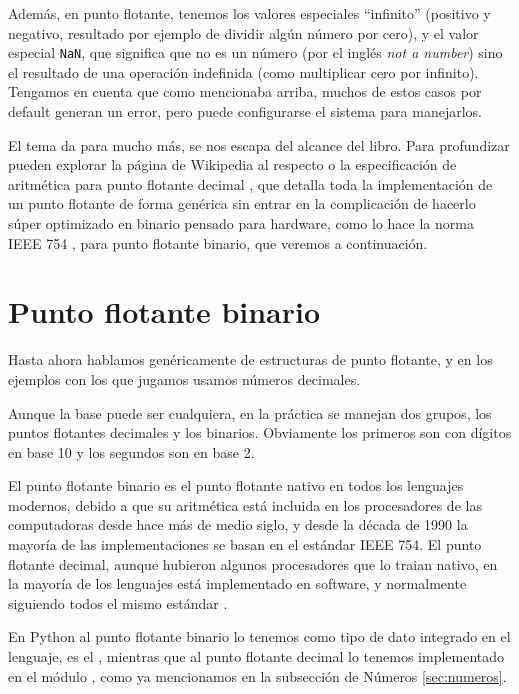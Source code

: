 Además, en punto flotante, tenemos los valores especiales ``infinito'' (positivo y negativo, resultado por ejemplo de dividir algún número por cero), y el valor especial \verb|NaN|, que significa que no es un número (por el inglés \textit{not a number}) sino el resultado de una operación indefinida (como multiplicar cero por infinito). Tengamos en cuenta que como mencionaba arriba, muchos de estos casos por default generan un error, pero puede configurarse el sistema para manejarlos.

El tema da para mucho más, se nos escapa del alcance del libro. Para profundizar pueden explorar la página de Wikipedia al respecto \cite{wikipedia-floating-point} o la especificación de aritmética para punto flotante decimal \cite{aritmetica-punto-flotante-decimal}, que detalla toda la implementación de un punto flotante de forma genérica sin entrar en la complicación de hacerlo súper optimizado en binario pensado para hardware, como lo hace la norma IEEE 754 \cite{ieee-754}, para punto flotante binario, que veremos a continuación.


\section{Punto flotante binario}\label{sec:pfbin}

Hasta ahora hablamos genéricamente de estructuras de punto flotante, y en los ejemplos con los que jugamos usamos números decimales. 

Aunque la base puede ser cualquiera, en la práctica se manejan dos grupos, los puntos flotantes decimales y los binarios. Obviamente los primeros son con dígitos en base 10 y los segundos son en base 2.

El punto flotante binario es el punto flotante nativo en todos los lenguajes modernos, debido a que su aritmética está incluida en los procesadores de las computadoras desde hace más de medio siglo, y desde la década de 1990 la mayoría de las implementaciones se basan en el estándar IEEE 754. El punto flotante decimal, aunque hubieron algunos procesadores que lo traian nativo, en la mayoría de los lenguajes está implementado en software, y normalmente siguiendo todos el mismo estándar \cite{decimal-spec}. 

En Python al punto flotante binario lo tenemos como tipo de dato integrado en el lenguaje, es el , mientras que al punto flotante decimal lo tenemos implementado en el módulo , como ya mencionamos en la subsección de Números \ref{sec:numeros}.

